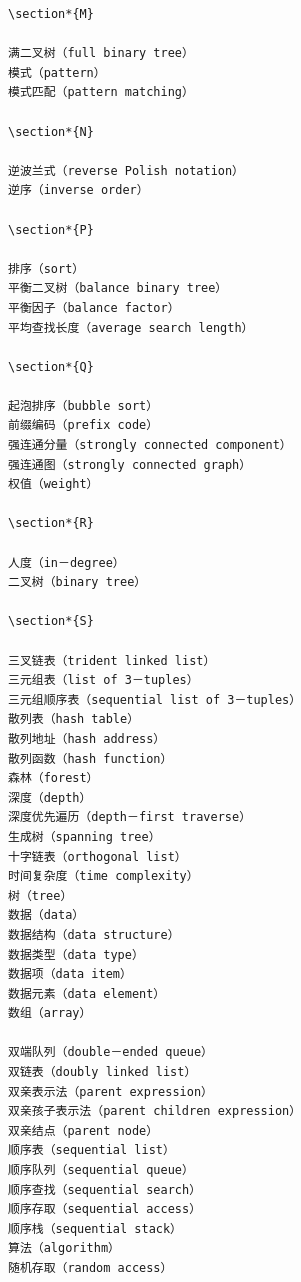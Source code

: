 \documentclass[10pt]{article}
\begin{document}
\begin{verbatim}
\section*{M}

满二叉树（full binary tree）
模式（pattern）
模式匹配（pattern matching）

\section*{N}

逆波兰式（reverse Polish notation）
逆序（inverse order）

\section*{P}

排序（sort）
平衡二叉树（balance binary tree）
平衡因子（balance factor）
平均查找长度（average search length）

\section*{Q}

起泡排序（bubble sort）
前缀编码（prefix code）
强连通分量（strongly connected component）
强连通图（strongly connected graph）
权值（weight）

\section*{R}

人度（in－degree）
二叉树（binary tree）

\section*{S}

三叉链表（trident linked list）
三元组表（list of 3－tuples）
三元组顺序表（sequential list of 3－tuples）
散列表（hash table）
散列地址（hash address）
散列函数（hash function）
森林（forest）
深度（depth）
深度优先遍历（depth－first traverse）
生成树（spanning tree）
十字链表（orthogonal list）
时间复杂度（time complexity）
树（tree）
数据（data）
数据结构（data structure）
数据类型（data type）
数据项（data item）
数据元素（data element）
数组（array）

双端队列（double－ended queue）
双链表（doubly linked list）
双亲表示法（parent expression）
双亲孩子表示法（parent children expression）
双亲结点（parent node）
顺序表（sequential list）
顺序队列（sequential queue）
顺序查找（sequential search）
顺序存取（sequential access）
顺序栈（sequential stack）
算法（algorithm）
随机存取（random access）


\end{verbatim}
\end{document}
